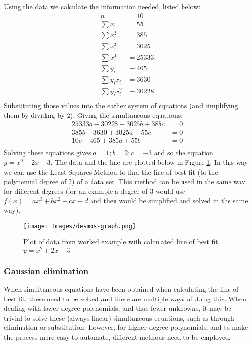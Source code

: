 \documentclass{article}
\begin{document}
Using the data we calculate the information needed, listed below:
\begin{align*}
    n &= 10 \\
    \sum x_i &= 55 \\
    \sum x_i^2 &= 385 \\
    \sum x_i^3 &= 3025 \\
    \sum x_i^4 &= 25333 \\
    \sum y_i &= 465 \\
    \sum y_i x_i &= 3630 \\
    \sum y_ix_i^2 &= 30228 \\ 
\end{align*}
Substituting those values into the earlier system of equations (and simplifying them by dividing by 2). Giving the simultaneous equations:
\begin{align*}
    25333a - 30228 + 3025b + 385c &= 0 \\
    385b - 3630 + 3025a + 55c &= 0 \\
    10c - 465 +385a + 55b &= 0 \\
\end{align*}
Solving these equations gives $a=1; b=2; c=-3$ and so the equation $y=x^2+2x-3$. The data and the line are plotted below in Figure \ref{workedgraph}. In this way we can use the Least Squares Method to find the line of best fit (to the polynomial degree of 2) of a data set. This method can be used in the same way for different degrees (for an example a degree of 3 would use $f(x) = ax^3 + bx^2 + cx + d$ and then would be simplified and solved in the same way).
\begin{figure}[H]
  \centering
  \texttt{[image: Images/desmos-graph.png]}  \caption{Plot of data from worked example with calculated line of best fit $y=x^2+2x-3$}
  \label{workedgraph}
\end{figure}
\subsubsection{Gaussian elimination}

When simultaneous equations have been obtained when calculating the line of best fit, these need to be solved and there are multiple ways of doing this. When dealing with lower degree polynomials, and thus fewer unknowns, it may be trivial to solve these (always linear) simultaneous equations, such as through elimination or substitution. However, for higher degree polynomials, and to make the process more easy to automate, different methods need to be employed.
\end{document}
